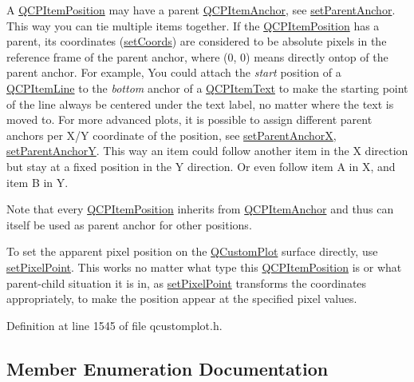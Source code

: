 A \hyperlink{class_q_c_p_item_position}{Q\+C\+P\+Item\+Position} may have a parent \hyperlink{class_q_c_p_item_anchor}{Q\+C\+P\+Item\+Anchor}, see \hyperlink{class_q_c_p_item_position_ac094d67a95d2dceafa0d50b9db3a7e51}{set\+Parent\+Anchor}. This way you can tie multiple items together. If the \hyperlink{class_q_c_p_item_position}{Q\+C\+P\+Item\+Position} has a parent, its coordinates (\hyperlink{class_q_c_p_item_position_aa988ba4e87ab684c9021017dcaba945f}{set\+Coords}) are considered to be absolute pixels in the reference frame of the parent anchor, where (0, 0) means directly ontop of the parent anchor. For example, You could attach the {\itshape start} position of a \hyperlink{class_q_c_p_item_line}{Q\+C\+P\+Item\+Line} to the {\itshape bottom} anchor of a \hyperlink{class_q_c_p_item_text}{Q\+C\+P\+Item\+Text} to make the starting point of the line always be centered under the text label, no matter where the text is moved to. For more advanced plots, it is possible to assign different parent anchors per X/Y coordinate of the position, see \hyperlink{class_q_c_p_item_position_add71461a973927c74e42179480916d9c}{set\+Parent\+AnchorX}, \hyperlink{class_q_c_p_item_position_add5ec1db9d19cec58a3b5c9e0a0c3f9d}{set\+Parent\+AnchorY}. This way an item could follow another item in the X direction but stay at a fixed position in the Y direction. Or even follow item A in X, and item B in Y.

Note that every \hyperlink{class_q_c_p_item_position}{Q\+C\+P\+Item\+Position} inherits from \hyperlink{class_q_c_p_item_anchor}{Q\+C\+P\+Item\+Anchor} and thus can itself be used as parent anchor for other positions.

To set the apparent pixel position on the \hyperlink{class_q_custom_plot}{Q\+Custom\+Plot} surface directly, use \hyperlink{class_q_c_p_item_position_ab404e56d9ac2ac2df0382c57933a71ef}{set\+Pixel\+Point}. This works no matter what type this \hyperlink{class_q_c_p_item_position}{Q\+C\+P\+Item\+Position} is or what parent-\/child situation it is in, as \hyperlink{class_q_c_p_item_position_ab404e56d9ac2ac2df0382c57933a71ef}{set\+Pixel\+Point} transforms the coordinates appropriately, to make the position appear at the specified pixel values. 

Definition at line 1545 of file qcustomplot.\+h.



\subsection{Member Enumeration Documentation}
